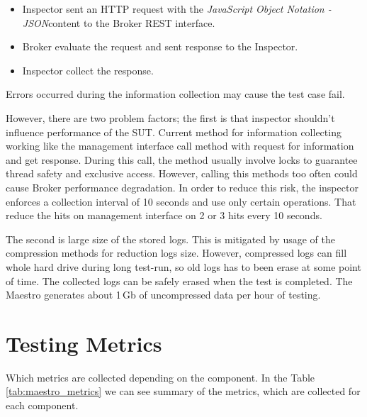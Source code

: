\begin{itemize}
	\setlength\itemsep{0em}
	\item Inspector sent an HTTP request with the \emph{JavaScript Object Notation - JSON}\footnotemark content to the Broker REST interface.
	\item Broker evaluate the request and sent response to the Inspector.
	\item Inspector collect the response.
\end{itemize}
Errors occurred during the information collection may cause the test case fail.


However, there are two problem factors; the first is that inspector shouldn't influence performance of the SUT. Current method for information collecting working like the management interface call method with request for information and get response. During this call, the method usually involve locks to guarantee thread safety and exclusive access. However, calling this methods too often could cause Broker performance degradation. In order to reduce this risk, the inspector enforces a collection interval of 10 seconds and use only certain operations. That reduce the hits on management interface on 2 or 3 hits every 10 seconds.

The second is large size of the stored logs. This is mitigated by usage of the compression methods for reduction logs size. However, compressed logs can fill whole hard drive during long test-run, so old logs has to been erase at some point of time. The collected logs can be safely erased when the test is completed. The Maestro generates about 1\,Gb of uncompressed data per hour of testing.




\section*{Testing Metrics}
\label{Testing Metrics}
Which metrics are collected depending on the component. In the Table \ref{tab:maestro_metrics} we can see summary of the metrics, which are collected for each component.

